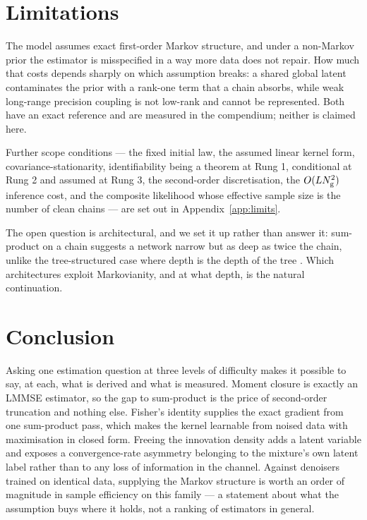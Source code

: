 \documentclass{article}
\begin{document}
\section{Limitations}
\label{sec:limits}

The model assumes exact first-order Markov structure, and under a non-Markov prior the estimator
is misspecified in a way more data does not repair. How much that costs depends sharply on which
assumption breaks: a shared global latent contaminates the prior with a rank-one term that a chain
absorbs, while weak long-range precision coupling is not low-rank and cannot be represented. Both
have an exact reference and are measured in the compendium; neither is claimed here.

Further scope conditions --- the fixed initial law, the assumed linear kernel form,
covariance-stationarity, identifiability being a theorem at Rung 1, conditional at Rung 2 and
assumed at Rung 3, the second-order discretisation, the $O(LN_{\mathrm{g}}^{2})$ inference cost, and
the composite likelihood whose effective sample size is the number of clean chains --- are set out
in Appendix~\ref{app:limits}.

The open question is architectural, and we set it up rather than answer it: sum-product on a chain
suggests a network narrow but as deep as twice the chain, unlike the tree-structured case where
depth is the depth of the tree \citep{mei2024unet,garnierbrun2024transformers}. Which architectures
exploit Markovianity, and at what depth, is the natural continuation.

\section{Conclusion}

Asking one estimation question at three levels of difficulty makes it possible to say, at each,
what is derived and what is measured. Moment closure is exactly an LMMSE estimator, so the gap to
sum-product is the price of second-order truncation and nothing else. Fisher's identity supplies
the exact gradient from one sum-product pass, which makes the kernel learnable from noised data
with maximisation in closed form. Freeing the innovation density adds a latent variable and
exposes a convergence-rate asymmetry belonging to the mixture's own latent label rather than to any
loss of information in the channel. Against denoisers trained on identical data, supplying
the Markov structure is worth an order of magnitude in sample efficiency on this family --- a
statement about what the assumption buys where it holds, not a ranking of estimators in general.

\label{LastMainPage}



\clearpage
\appendix

\end{document}
